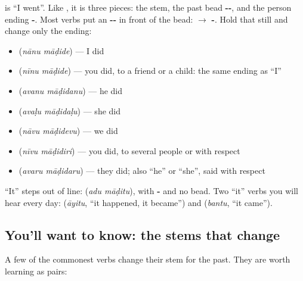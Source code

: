 \textbf{} is \textquotedblleft{}I went\textquotedblright{}. Like \textbf{}, it is three pieces: the stem, the past bead \textbf{--}, and the person ending \textbf{-}. Most verbs put an \textbf{--} in front of the bead: \textbf{} $\to$ \textbf{-}. Hold that still and change only the ending:

\begin{itemize}
\raggedright
  \item \textbf{ } (\emph{nānu māḍide}) — I did
  \item \textbf{ } (\emph{nīnu māḍide}) — you did, to a friend or a child: the same ending as \textquotedblleft{}I\textquotedblright{}
  \item \textbf{ } (\emph{avanu māḍidanu}) — he did
  \item \textbf{ } (\emph{avaḷu māḍidaḷu}) — she did
  \item \textbf{ } (\emph{nāvu māḍidevu}) — we did
  \item \textbf{ } (\emph{nīvu māḍidiri}) — you did, to several people or with respect
  \item \textbf{ } (\emph{avaru māḍidaru}) — they did; also \textquotedblleft{}he\textquotedblright{} or \textquotedblleft{}she\textquotedblright{}, said with respect
\end{itemize}

\textquotedblleft{}It\textquotedblright{} steps out of line: \textbf{ } (\emph{adu māḍitu}), with \textbf{-} and no bead. Two \textquotedblleft{}it\textquotedblright{} verbs you will hear every day: \textbf{} (\emph{āyitu}, \textquotedblleft{}it happened, it became\textquotedblright{}) and \textbf{} (\emph{bantu}, \textquotedblleft{}it came\textquotedblright{}).

\subsection*{You'll want to know: the stems that change}
A few of the commonest verbs change their stem for the past. They are worth learning as pairs:

